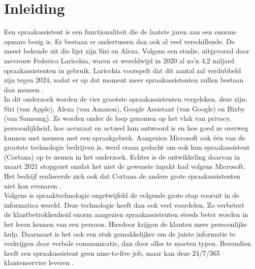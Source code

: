 \documentclass{hogent-article}
\affiliation{
  \textsuperscript{1} \href{mailto:kobe.dehandschutter@student.hogent.be}{kobe.dehandschutter@student.hogent.be}
}
\begin{document}
\flushbottom %
\maketitle %
\tableofcontents %
\thispagestyle{empty} %


\section{Inleiding}



Een spraakassistent is een functionaliteit die de laatste jaren aan een enorme opmars bezig is.
Er bestaan er ondertussen dan ook al veel verschillende. De meest bekende uit die lijst zijn Siri en Alexa.
Volgens een studie, uitgevoerd door mevrouw Federica Laricchia, waren er wereldwijd in 2020 al zo'n 4,2 miljard spraakassistenten in gebruik. Laricchia voorspelt dat dit aantal zal verdubbeld zijn tegen 2024, zodat er op dat moment meer spraakassistenten zullen bestaan dan mensen \autocite{Laricchia2022}.
\\\indent
In dit onderzoek worden de vier grootste spraakassistenten vergeleken, deze zijn: Siri (van Apple), Alexa (van Amazon), Google Assistant (van Google) en Bixby (van Samsung). Ze worden onder de loep genomen op het vlak van privacy, persoonlijkheid, hoe accuraat en actueel hun antwoord is en hoe goed ze overweg kunnen met mensen met een spraakgebrek. Aangezien Microsoft ook één van de grootste technologie bedrijven is, werd eraan gedacht om ook hun spraakassistent (Cortana) op te nemen in het onderzoek. Echter is de ontwikkeling daarvan in maart 2021 stopgezet omdat het niet de gewenste inpakt had volgens Microsoft. Het bedrijf realiseerde zich ook dat Cortana de andere grote spraakassistenten niet kon evenaren \autocite{Tiwari2021}.
\\\indent
Volgens \textcite{Benke2021} is spraaktechnologie ongetwijfeld de volgende grote stap vooruit in de informatica wereld. Deze technologie heeft dan ook veel voordelen. Zo verbetert de klantbetrokkenheid enorm aangezien spraakassistenten steeds beter worden in het leren kennen van een persoon. Hierdoor krijgen de klanten meer persoonlijke hulp. Daarnaast is het ook een stuk gemakkelijker om de juiste informatie te verkrijgen door verbale communicatie, dan door alles te moeten typen. Bovendien heeft een spraakassistent geen nine-to-five job, maar kan deze 24/7/365 klantenservice leveren \autocite{Benke2021}.
\end{document}
